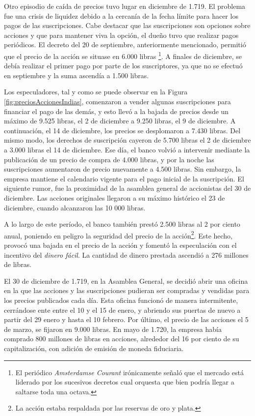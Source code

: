 Otro episodio de caída de precios tuvo lugar en diciembre de 1.719. El problema fue una crisis de liquidez debido a la cercanía de la fecha límite para hacer los pagos de las suscripciones. Cabe destacar que las suscripciones son opciones sobre acciones y que para mantener viva la opción, el dueño tuvo que realizar pagos periódicos. El decreto del 20 de septiembre, anteriormente mencionado, permitió que el precio de la acción se situase en 6.000 libras	\footnote{El periódico \emph{Amsterdamse Courant} irónicamente señaló que el mercado está liderado por los sucesivos decretos cual orquesta que bien podría llegar a saltarse toda una octava.}. A finales de diciembre, se debía realizar el primer pago por parte de los suscriptores, ya que no se efectuó en septiembre y la suma ascendía a 1.500 libras.

Los especuladores, tal y como se puede observar en la Figura \ref{fig:preciosAccionesIndias},  comenzaron a vender algunas suscripciones para financiar el pago de las demás, y esto llevó a la bajada de precios desde un máximo de 9.525 libras, el 2 de diciembre a 9.250 libras, el 9 de diciembre. A continuación, el 14 de diciembre, los precios se desplomaron a 7.430 libras. Del mismo modo, los derechos de suscripción cayeron de 5.700 libras el 2 de diciembre a 3.000 libras el 14 de diciembre. Ese día, el banco volvió a intervenir mediante la publicación de un precio de compra de 4.000 libras, y por la noche las suscripciones aumentaron de precio nuevamente a 4.500 libras. Sin embargo, la empresa mantiene el calendario vigente para el pago inicial de la suscripción. El siguiente rumor, fue la proximidad de la asamblea general de accionistas del 30 de diciembre. Las acciones originales llegaron a su máximo histórico el 23 de diciembre, cuando alcanzaron las 10 000 libras.

A lo largo de este período, el banco también prestó 2.500 libras al 2 por ciento anual, poniendo en peligro la seguridad del precio de la acción\footnote{La acción estaba respaldada por las reservas de oro y plata.}. Este hecho,  provocó una bajada en el precio de la acción y fomentó la especulación con el incentivo del \emph{dinero fácil}. La cantidad de dinero prestada ascendió a 276 millones de libras.

El 30 de diciembre de 1.719, en la Asamblea General, se decidió abrir una oficina en la que las acciones y las suscripciones pudieran ser compradas y vendidas para los precios publicados cada día. Esta oficina funcionó de manera intermitente, cerrándose ente entre el 10 y el 15 de enero, y abriendo sus puertas de nuevo a partir del 29 enero y hasta el 10 febrero. Por último, el precio de las acciones el 5 de marzo, se fijaron en 9.000 libras. En mayo de 1.720, la empresa había comprado 800 millones de libras en acciones, alrededor del 16 por ciento de su capitalización, con adición de emisión de moneda fiduciaria.

